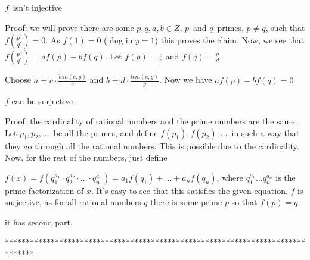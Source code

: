 \begin{solution}
	$f$ isn't injective

Proof: we will prove there are some $p, q, a, b \in Z$, $p$ and $q$ primes, $p \neq q$, such that $f(\frac{p^a}{q^b}) = 0$. As $f(1) = 0$ (plug in $y = 1$) this proves the claim.
Now, we see that $f(\frac{p^a}{q^b}) = af(p) - bf(q)$. Let $f(p) = \frac{e}{c}$ and $f(q) = \frac{g}{d}$.

Choose $a = c \cdot \frac{lcm(e, g)}{e}$ and $b = d \cdot \frac{lcm(e, g)}{g}$. Now we have $af(p) - bf(q) = 0$


$f$ can be surjective

Proof: the cardinality of rational numbers and the prime numbers are the same. Let $p_1, p_2, \ldots$ be all the primes, and define $f(p_1), f(p_2), \ldots$ in such a way that they go through all the rational numbers. This is possible due to the cardinality. Now, for the rest of the numbers, just define

$f(x) = f(q_1^{a_1} \cdot q_2^{a_2} \cdot \ldots \cdot q_n^{a_n}) = a_1f(q_1) + \ldots + a_n  f(q_n)$, where $q_1^{a_1}  \ldots q_n^{a_n}$ is the prime factorization of $x$. It's easy to see that this satisfies the given equation. $f$ is surjective, as for all rational numbers $q$ there is some prime $p$ so that $f(p) = q$.
\end{solution}






\begin{solution}
	 it has second part.
\end{solution}
*******************************************************************************
-------------------------------------------------------------------------------

